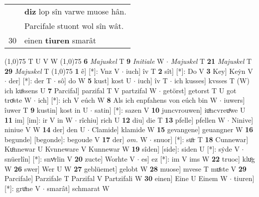 \documentclass[8pt,a4paper,notitlepage]{article}
\begin{document}
\begin{table}[ht]
\begin{minipage}[t]{0.5\linewidth}
\begin{tabular}{rl}
 & \textbf{diz} lop sîn varwe muose hân.\\ 
 & Parcifale stuont wol sîn wât.\\ 
30 & einen \textbf{tiuren} smarât\\ 
\end{tabular}
\scriptsize
\line(1,0){75} \newline
T U V W \newline
\line(1,0){75} \newline
\textbf{6} \textit{Majuskel} T  \textbf{9} \textit{Initiale} W   $\cdot$ \textit{Majuskel} T  \textbf{21} \textit{Majuskel} T  \textbf{29} \textit{Majuskel} T  \newline
\line(1,0){75} \newline
\textbf{1} ê] [*]: Vnz V  $\cdot$ iuch] îv T \textbf{2} sît] [*]: Do V \textbf{3} Key] Keẏn V  $\cdot$ der] [*]: der T  $\cdot$ sô] do W \textbf{5} kust] kost U  $\cdot$ iuch] îv T  $\cdot$ ich kusses] kvsses T (W) ich kuͦssens U \textbf{7} Parcifal] parzifal T V partzifal W  $\cdot$ getörst] getorst T U got troͤste W  $\cdot$ ich] [*]: ich V eúch W \textbf{8} Als ich enpfahens von eúch bin W  $\cdot$ iuwers] îuwer T \textbf{9} kustin] kost in U  $\cdot$ satin] [*]: sazen V \textbf{10} juncvrouwen] iuͦncvreuͦwe U \textbf{11} im] [im]: ir V in W  $\cdot$ rîchiu] rich U \textbf{12} diu] die T \textbf{13} pfelle] pfellen W  $\cdot$ Ninive] niniue V W \textbf{14} der] den U  $\cdot$ Clamide] klamide W \textbf{15} gevangene] geuangner W \textbf{16} begunde] [begonde]: begoude V \textbf{17} der] \textit{om.} W  $\cdot$ snuor] [*]: suͦr T \textbf{18} Cunnewar] Kuͦnnewar U Kvnneware V Kunnewar W \textbf{19} sîden] [side]: siden U [*]: sẏde V  $\cdot$ snüerlîn] [*]: snvͤrlin V \textbf{20} zucte] Worhte V  $\cdot$ es] ez [*]: im V ims W \textbf{22} truoc] kluͦg W \textbf{26} swer] Wer U W \textbf{27} geblüemet] gelobt W \textbf{28} muose] mvese T muͤste V \textbf{29} Parcifale] Parzifale T Parzifal V Partzifali W \textbf{30} einen] Eine U Einem W  $\cdot$ tiuren] [*]: gruͤne V  $\cdot$ smarât] schmarat W \newline
\end{minipage}
\end{table}
\end{document}
